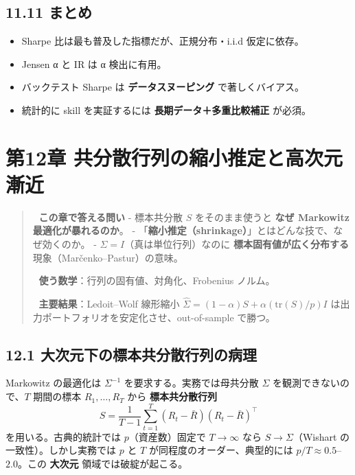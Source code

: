 \documentclass[11pt,a4paper]{report}
\begin{document}
\section{11.11 まとめ}

\begin{itemize}
\item Sharpe 比は最も普及した指標だが、正規分布・i.i.d 仮定に依存。
\item Jensen α と IR は α 検出に有用。
\item バックテスト Sharpe は \textbf{データスヌーピング} で著しくバイアス。
\item 統計的に skill を実証するには \textbf{長期データ＋多重比較補正} が必須。
\end{itemize}

\noindent\hrulefill

\chapter{第12章 共分散行列の縮小推定と高次元漸近}

\begin{quote}
🎯 \textbf{この章で答える問い}
- 標本共分散 $S$ をそのまま使うと \textbf{なぜ Markowitz 最適化が暴れるのか}。
- 「\textbf{縮小推定（shrinkage）}」とはどんな技で、なぜ効くのか。
- $\Sigma = I$（真は単位行列）なのに \textbf{標本固有値が広く分布する} 現象（Marčenko–Pastur）の意味。

📐 \textbf{使う数学}：行列の固有値、対角化、Frobenius ノルム。

🔑 \textbf{主要結果}：Ledoit–Wolf 線形縮小 $\hat\Sigma = (1-\alpha) S + \alpha (\mathrm{tr}(S)/p) I$ は出力ポートフォリオを安定化させ、out-of-sample で勝つ。
\end{quote}

\section{12.1 大次元下の標本共分散行列の病理}

Markowitz の最適化は $\Sigma^{-1}$ を要求する。実務では母共分散 $\Sigma$ を観測できないので、$T$ 期間の標本 $R_1, \dots, R_T$ から \textbf{標本共分散行列} \[ S = \frac{1}{T-1} \sum_{t=1}^T (R_t - \bar R)(R_t - \bar R)^\top \] を用いる。古典的統計では $p$（資産数）固定で $T \to \infty$ なら $S \to \Sigma$（Wishart の一致性）。しかし実務では $p$ と $T$ が同程度のオーダー、典型的には $p/T \approx 0.5$–$2.0$。この \textbf{大次元} 領域では破綻が起こる。
\end{document}
